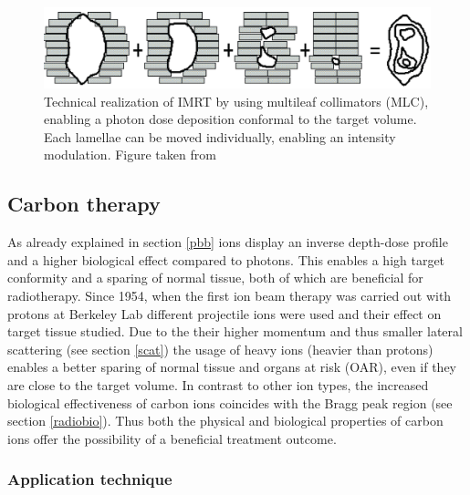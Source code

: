 \vspace*{-0.3cm}

\begin{figure}[H]
\begin{center}
\includegraphics[scale=0.2]{./teile/introduction/lamellen.png}
\caption{Technical realization of IMRT by using multileaf collimators (MLC), enabling a photon dose deposition conformal to the 
target volume. Each lamellae can be moved individually, enabling an intensity modulation. Figure taken from \cite{Schl01}}
\label{lamellen}
\end{center}
\end{figure}


\subsection{Carbon therapy}

As already explained in section \ref{pbb} ions display an inverse depth-dose profile and a higher biological effect compared to photons. 
This enables a high target conformity and a sparing of normal tissue, both of which are beneficial for radiotherapy. 
Since 1954, when the first ion beam therapy was carried out with protons at Berkeley Lab \cite{Tob58} different projectile ions were 
used and their effect on target tissue studied.\newline
\newline
Due to the their higher momentum and thus smaller lateral scattering (see section \ref{scat}) the usage of heavy ions (heavier than protons) 
enables a better sparing of normal tissue and organs at risk (OAR), even if they are close to the target volume. 
In contrast to other ion types, the increased biological effectiveness of carbon ions  coincides with the Bragg peak region (see section 
\ref{radiobio}). Thus both the physical and biological properties of carbon ions offer the possibility of a beneficial treatment outcome. 

\subsubsection*{Application technique}


